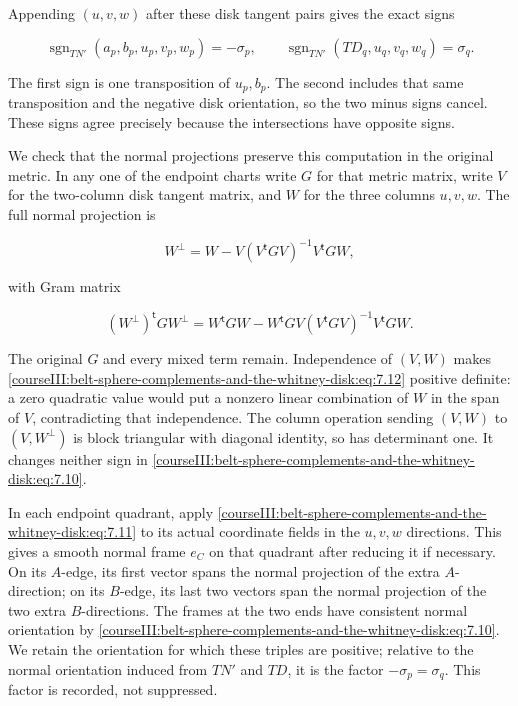 Appending \((u,v,w)\) after these disk tangent pairs gives the exact signs

\begin{equation}
\operatorname{sgn}_{TN'}(a_p,b_p,u_p,v_p,w_p)=-\sigma_p,
\qquad
\operatorname{sgn}_{TN'}(TD_q,u_q,v_q,w_q)=\sigma_q.
\label{courseIII:belt-sphere-complements-and-the-whitney-disk:eq:7.10}
\end{equation}

The first sign is one transposition of \(u_p,b_p\). The second includes that same transposition and the negative disk orientation, so the two minus signs cancel. These signs agree precisely because the intersections have opposite signs.

We check that the normal projections preserve this computation in the original metric. In any one of the endpoint charts write \(G\) for that metric matrix, write \(V\) for the two-column disk tangent matrix, and \(W\) for the three columns \(u,v,w\). The full normal projection is

\begin{equation}
W^\perp=W-
 V(V^{\mathsf t}GV)^{-1}V^{\mathsf t}GW,
\label{courseIII:belt-sphere-complements-and-the-whitney-disk:eq:7.11}
\end{equation}

with Gram matrix

\begin{equation}
(W^\perp)^{\mathsf t}GW^\perp
=W^{\mathsf t}GW
 -W^{\mathsf t}GV(V^{\mathsf t}GV)^{-1}V^{\mathsf t}GW.
\label{courseIII:belt-sphere-complements-and-the-whitney-disk:eq:7.12}
\end{equation}

The original \(G\) and every mixed term remain. Independence of \((V,W)\) makes \eqref{courseIII:belt-sphere-complements-and-the-whitney-disk:eq:7.12} positive definite: a zero quadratic value would put a nonzero linear combination of \(W\) in the span of \(V\), contradicting that independence. The column operation sending \((V,W)\) to \((V,W^\perp)\) is block triangular with diagonal identity, so has determinant one. It changes neither sign in \eqref{courseIII:belt-sphere-complements-and-the-whitney-disk:eq:7.10}.

In each endpoint quadrant, apply \eqref{courseIII:belt-sphere-complements-and-the-whitney-disk:eq:7.11} to its actual coordinate fields in the \(u,v,w\) directions. This gives a smooth normal frame \(e_C\) on that quadrant after reducing it if necessary. On its \(A\)-edge, its first vector spans the normal projection of the extra \(A\)-direction; on its \(B\)-edge, its last two vectors span the normal projection of the two extra \(B\)-directions. The frames at the two ends have consistent normal orientation by \eqref{courseIII:belt-sphere-complements-and-the-whitney-disk:eq:7.10}. We retain the orientation for which these triples are positive; relative to the normal orientation induced from \(TN'\) and \(TD\), it is the factor \(-\sigma_p=\sigma_q\). This factor is recorded, not suppressed.

